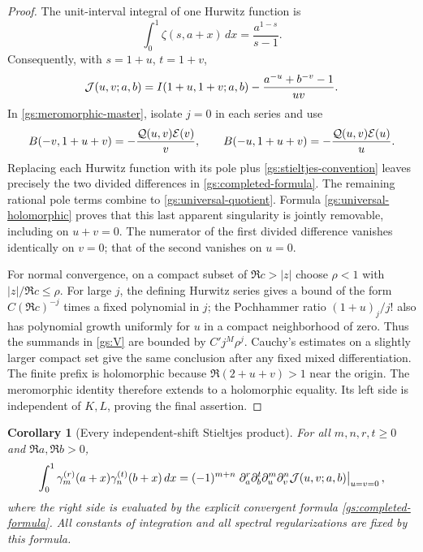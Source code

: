 \documentclass[11pt,letterpaper]{article}
\numberwithin{equation}{section}
\newtheorem{corollary}[theorem]{Corollary}
\theoremstyle{definition}
\theoremstyle{remark}
\begin{document}
\begin{proof}
The unit-interval integral of one Hurwitz function is
\[
 \int_0^1\zeta(s,a+x)\,dx=\frac{a^{1-s}}{s-1}.
\]
Consequently, with $s=1+u$, $t=1+v$,
\begin{equation}\label{gs:pole-removal}
 \mathcal J(u,v;a,b)=I(1+u,1+v;a,b)
             -\frac{a^{-u}+b^{-v}-1}{uv}.
\end{equation}
In \eqref{gs:meromorphic-master}, isolate $j=0$ in each series and
use
\[
 B(-v,1+u+v)=-\frac{\mathcal Q(u,v)\mathcal E(v)}v,
 \qquad
 B(-u,1+u+v)=-\frac{\mathcal Q(u,v)\mathcal E(u)}u.
\]
Replacing each Hurwitz function with its pole plus \eqref{gs:stieltjes-convention}
leaves precisely the two divided differences in
\eqref{gs:completed-formula}.  The remaining rational pole terms
combine to \eqref{gs:universal-quotient}.  Formula
\eqref{gs:universal-holomorphic} proves that this last apparent
singularity is jointly removable, including on $u+v=0$.
The numerator of the first divided difference vanishes identically
on $v=0$; that of the second vanishes on $u=0$.

For normal convergence, on a compact subset of
$\Re c>|z|$ choose $\rho<1$ with $|z|/\Re c\le\rho$.
For large $j$, the defining Hurwitz series gives a bound of the form
$C(\Re c)^{-j}$ times a fixed polynomial in $j$; the Pochhammer
ratio $(1+u)_j/j!$ also has polynomial growth uniformly for $u$ in
a compact neighborhood of zero.  Thus the summands in
\eqref{gs:V} are bounded by $C'j^M\rho^j$.  Cauchy's estimates
on a slightly larger compact set give the same conclusion after any
fixed mixed differentiation.  The finite prefix is holomorphic
because $\Re(2+u+v)>1$ near the origin.
The meromorphic identity therefore extends to a holomorphic equality.
Its left side is independent of $K,L$, proving the final assertion.
\end{proof}

\begin{corollary}[Every independent-shift Stieltjes product]
\label{gs:all-indices}
For all $m,n,r,t\ge0$ and $\Re a,\Re b>0$,
\begin{equation}\label{gs:all-indices-formula}
 \int_0^1\gamma_m^{(r)}(a+x)\gamma_n^{(t)}(b+x)\,dx
 =(-1)^{m+n}
 \left.\partial_a^r\partial_b^t\partial_u^m\partial_v^n
                  \mathcal J(u,v;a,b)\right|_{u=v=0},
\end{equation}
where the right side is evaluated by the explicit convergent formula
\eqref{gs:completed-formula}.  All constants of integration and all
spectral regularizations are fixed by this formula.
\end{corollary}
\end{document}

